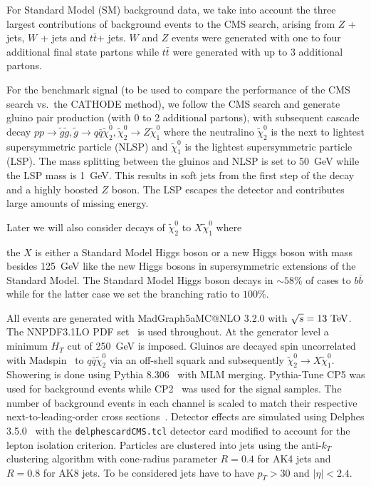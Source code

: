 \documentclass[prd, twocolumn, superscriptaddress,floatfix, nofootinbib, preprintnumbers]{revtex4-2}
\begin{document}
For Standard Model (SM) background data, we take into account the three largest contributions of background events to the CMS search,
arising from $Z$ + jets, $W$ + jets and $t \bar{t}$+ jets. $W$ and $Z$ events were generated with one to four additional final state partons while $t \bar{t}$ were generated with up to 3 additional partons. 


For the benchmark signal (to be used to compare the performance of the CMS search vs.\ the CATHODE method), we follow the CMS search and generate gluino pair production (with 0 to 2 additional partons), with subsequent cascade decay $p p \rightarrow \widetilde{g} \widetilde{g}, \widetilde{g}\rightarrow q \bar{q} \widetilde{\chi}_2^0, \widetilde{\chi}_2^0 \rightarrow Z \widetilde{\chi}_1^0$ where the neutralino $\widetilde{\chi}_2^0$ is the next to lightest supersymmetric particle (NLSP) and $\widetilde{\chi}_1^0$ is the lightest supersymmetric particle (LSP). The mass splitting between the gluinos and NLSP is set to 50~GeV while the LSP mass is 1~GeV. This results in soft jets from the first step of the decay and a highly boosted $Z$ boson. The LSP escapes the detector and contributes large amounts of missing energy.

Later we will also consider decays of $\widetilde{\chi}_2^0$ to $X\widetilde{\chi}_1^0$ where 
 
the $X$ is either a Standard Model Higgs boson or a new Higgs boson with mass besides 125~{\rm GeV} like the new Higgs bosons in supersymmetric extensions of the Standard Model. The Standard Model Higgs boson decays in $\sim 58\%$ of cases to $b \bar{b}$ while for the latter case we set the branching ratio to $100\%$.

All events are generated with  {\sc MadGraph5\textunderscore aMC@NLO 3.2.0} with $\sqrt{s}=13~{\rm TeV}$. The {\sc NNPDF3.1LO} PDF set~\cite{NNPDF:2017mvq} is used throughout. At the generator level a minimum $H_T$ cut of 250~GeV is imposed. Gluinos are decayed spin uncorrelated with {\sc Madspin}~\cite{Artoisenet:2012st} to $q \bar{q} \widetilde{\chi}_2^0 $ via an off-shell squark and subsequently $\widetilde{\chi}_2^0 \rightarrow X \widetilde{\chi}_1^0$.
Showering is done using {\sc Pythia 8.306}~\cite{Bierlich:2022pfr} with MLM \cite{MANGANO2002343,MLM2} merging. {\sc Pythia}-Tune CP5 was used for background events while CP2~\cite{CMS:2019csb} was used for the signal samples. The number of background events in each channel is scaled to match their respective next-to-leading-order cross sections~\cite{Alwall:2014hca}.
Detector effects are simulated using {\sc Delphes 3.5.0}~\cite{deFavereau:2013fsa} with the \texttt{delphes\textunderscore card\textunderscore CMS.tcl} detector card modified to account for the lepton isolation criterion. Particles are clustered into jets using the anti-$k_T$ clustering algorithm with cone-radius parameter $R=0.4$ for AK4 jets and $R=0.8$ for AK8 jets. To be considered jets have to have $p_T>30$ and $\vert \eta \vert < 2.4$.
\end{document}
